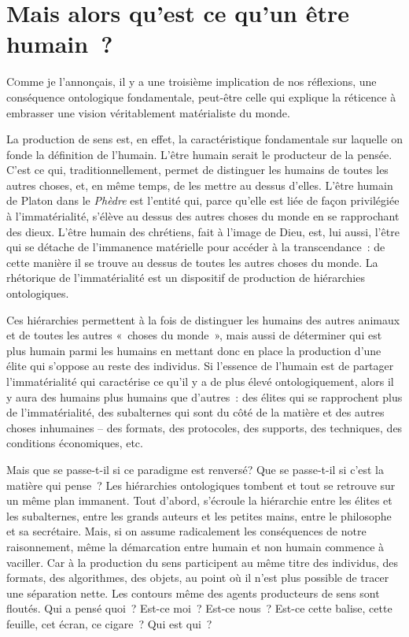 \hypertarget{mais-alors-quest-ce-quun-uxeatre-humain}{%
\chapter{Mais alors qu'est ce qu'un être
humain~?}\label{mais-alors-quest-ce-quun-uxeatre-humain}}

\lettrine{C}omme je l'annonçais, il y a une troisième implication de nos
réflexions, une conséquence ontologique fondamentale, peut-être celle
qui explique la réticence à embrasser une vision véritablement
matérialiste du monde.

La production de sens est, en effet, la caractéristique fondamentale sur
laquelle on fonde la définition de l'humain. L'être humain serait le
producteur de la pensée. C'est ce qui, traditionnellement, permet de
distinguer les humains de toutes les autres choses, et, en même temps,
de les mettre au dessus d'elles. L'être humain de Platon dans le
\emph{Phèdre} est l'entité qui, parce qu'elle est liée de façon
privilégiée à l'immatérialité, s'élève au dessus des autres choses du
monde en se rapprochant des dieux. L'être humain des chrétiens, fait à
l'image de Dieu, est, lui aussi, l'être qui se détache de l'immanence
matérielle pour accéder à la transcendance~: de cette manière il se
trouve au dessus de toutes les autres choses du monde. La rhétorique de
l'immatérialité est un dispositif de production de hiérarchies
ontologiques.

Ces hiérarchies permettent à la fois de distinguer les humains des
autres animaux et de toutes les autres «~choses du monde~», mais aussi
de déterminer qui est plus humain parmi les humains en mettant donc en
place la production d'une élite qui s'oppose au reste des individus. Si
l'essence de l'humain est de partager l'immatérialité qui caractérise ce
qu'il y a de plus élevé ontologiquement, alors il y aura des humains
plus humains que d'autres~: des élites qui se rapprochent plus de
l'immatérialité, des subalternes qui sont du côté de la matière et des
autres choses inhumaines -- des formats, des protocoles, des supports,
des techniques, des conditions économiques, etc.

Mais que se passe-t-il si ce paradigme est renversé? Que se passe-t-il
si c'est la matière qui pense~? Les hiérarchies ontologiques tombent et
tout se retrouve sur un même plan immanent. Tout d'abord, s'écroule la
hiérarchie entre les élites et les subalternes, entre les grands auteurs
et les petites mains, entre le philosophe et sa secrétaire. Mais, si on
assume radicalement les conséquences de notre raisonnement, même la
démarcation entre humain et non humain commence à vaciller. Car à la
production du sens participent au même titre des individus, des formats,
des algorithmes, des objets, au point où il n'est plus possible de
tracer une séparation nette. Les contours même des agents producteurs de
sens sont floutés. Qui a pensé quoi~? Est-ce moi~? Est-ce nous~? Est-ce
cette balise, cette feuille, cet écran, ce cigare~? Qui est qui~?

